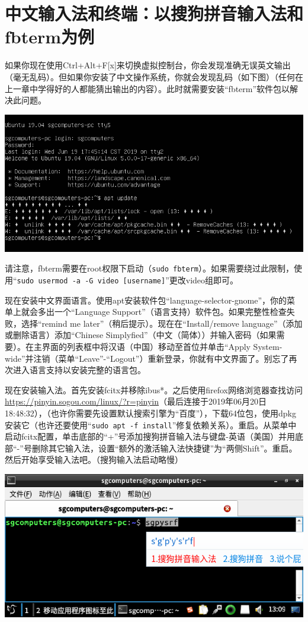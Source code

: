 \section{中文输入法和终端：以搜狗拼音输入法和fbterm为例}
如果你现在使用Ctrl+Alt+F[x]来切换虚拟控制台，你会发现准确无误英文输出（毫无乱码）。但如果你安装了中文操作系统，你就会发现乱码（如下图）（任何在上一章中学得好的人都能猜出输出的内容）。此时就需要安装“fbterm”软件包以解决此问题。
\begin{center}
	\includegraphics[width=0.7\linewidth]{pic/fbt1}
\end{center} \par
请注意，fbterm需要在root权限下启动（\verb|sudo fbterm|）。如果需要绕过此限制，使用“\verb|sudo usermod -a -G video [username]|”更改video组即可。\par
现在安装中文界面语言。使用apt安装软件包“language-selector-gnome”，你的菜单上就会多出一个“Language Support”（语言支持）软件包。如果完整性检查失败，选择“remind me later”（稍后提示）。现在在“Install/remove language”（添加或删除语言）添加“Chinese Simplyfied”（中文（简体））并输入密码（如果需要）。在主界面的列表框中将汉语（中国）移动至首位并单击“Apply System-wide”并注销（菜单“Leave”-“Logout”）重新登录，你就有中文界面了。别忘了再次进入语言支持以安装完整的语言包。\par
现在安装输入法。首先安装fcitx并移除ibus*。之后使用firefox网络浏览器查找访问\url{https://pinyin.sogou.com/linux/?r=pinyin}（最后连接于2019年06月20日18:48:32），（也许你需要先设置默认搜索引擎为“百度”），下载64位包，使用dpkg安装它（也许还要使用“\verb|sudo apt -f install|”修复依赖关系）。重启。从菜单中启动fcitx配置，单击底部的“+”号添加搜狗拼音输入法与键盘-英语（美国）并用底部“-”号删除其它输入法，设置“额外的激活输入法快捷键”为“两侧Shift”。重启。然后开始享受输入法吧。（搜狗输入法启动略慢）
\begin{center}
	\includegraphics[width=0.7\linewidth]{pic/fbt2}
\end{center}
